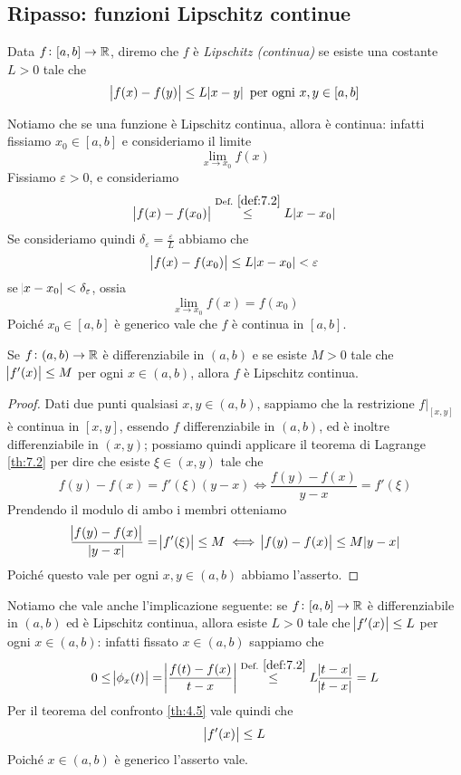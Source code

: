 \subsection{Ripasso: funzioni Lipschitz continue}
\begin{definition}
    \label{def:7.2}
    Data $f\colon[a,b]\to \amsbb{R}$, diremo che $f$ è \emph{Lipschitz (continua)} se esiste una costante $L>0$ tale che
    \[
    \abs{f(x)-f(y)}\le L \abs{x-y} \ \text{per ogni} \ x,y\in[a,b]
    \]
\end{definition}
\begin{remark}
    Notiamo che se una funzione è Lipschitz continua, allora è continua: infatti fissiamo $x_0\in[a,b]$ e consideriamo il limite 
    \[
    \lim_{x\to x_0} f(x)
    \]
    Fissiamo $\varepsilon>0$, e consideriamo
    \[
    \abs{f(x)-f(x_0)}\overset{\text{Def.} \ \ref{def:7.2}}{\le}  L\abs{x-x_0}
    \]
    Se consideriamo quindi $\delta_\varepsilon = \frac{\varepsilon}{L}$ abbiamo che
    \[
    \abs{f(x)-f(x_0)}\le L \abs{x-x_0}<\varepsilon
    \]
    se $\abs{x-x_0}<\delta_\varepsilon$, ossia 
    \[
    \lim_{x\to x_0} f(x) = f(x_0)
    \]
    Poiché $x_0\in[a,b]$ è generico vale che $f$ è continua in $[a,b]$.
\end{remark}
\begin{theorem}
    \label{th:7.4}
    Se $f\colon(a,b)\to \amsbb{R}$ è differenziabile in $(a,b)$ e se esiste $M> 0$ tale che $\abs{f'(x)}\le M$ per ogni $x\in(a,b)$, allora $f$ è Lipschitz continua.
\end{theorem}
\begin{proof}
    Dati due punti qualsiasi $x,y\in (a,b)$, sappiamo che la restrizione $f|_{[x,y]}$ è continua in $[x,y]$, essendo $f$ differenziabile in $(a,b)$, ed è inoltre differenziabile in $(x,y)$; possiamo quindi applicare il teorema di Lagrange \ref{th:7.2} per dire che esiste $\xi\in(x,y)$ tale che
    \[
    f(y)-f(x) = f'(\xi)(y-x) \iff \frac{f(y)-f(x)}{y-x} = f'(\xi)
    \]
    Prendendo il modulo di ambo i membri otteniamo
    \[
    \frac{\abs{f(y)-f(x)}}{\abs{y-x}} = \abs{f'(\xi)}\le M \iff \abs{f(y)-f(x)}\le M \abs{y-x}
    \]
    Poiché questo vale per ogni $x,y\in (a,b)$ abbiamo l'asserto.
\end{proof}
\begin{remark}
    Notiamo che vale anche l'implicazione seguente: se $f\colon[a,b]\to \amsbb{R}$ è differenziabile in $(a,b)$ ed è Lipschitz continua, allora esiste $L>0$ tale che $\abs{f'(x)}\le L$ per ogni $x\in(a,b)$: infatti fissato $x\in(a,b)$ sappiamo che
    \[
    0\le \abs{\phi_x(t)} = \abs{\frac{f(t)-f(x)}{t-x}} \overset{\text{Def.} \ \ref{def:7.2}}{\le } L \frac{\abs{t-x}}{\abs{t-x}} = L
    \]
    Per il teorema del confronto \ref{th:4.5} vale quindi che
    \[
    \abs{f'(x)}\le L
    \]
    Poiché $x\in(a,b)$ è generico l'asserto vale.
\end{remark}
